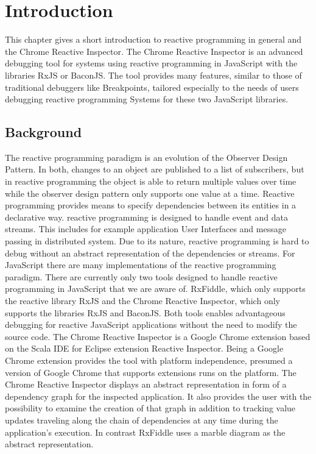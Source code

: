 \chapter{Introduction} \label{ch:Introduction}
This chapter gives a short introduction to reactive programming in general and the Chrome Reactive Inspector. The Chrome Reactive Inspector is an advanced debugging tool for systems using reactive programming in JavaScript with the libraries RxJS or BaconJS. The tool provides many features, similar to those of traditional debuggers like Breakpoints, tailored especially to the needs of users debugging reactive programming Systems for these two JavaScript libraries.

\section{Background}
The reactive programming paradigm is an evolution of the Observer Design Pattern. In both, changes to an object are published to a list of subscribers, but in reactive programming the object is able to return multiple values over time while the observer design pattern only supports one value at a time. Reactive programming provides means to specify dependencies between its entities in a declarative way. reactive programming is designed to handle event and data streams. This includes for example application User Interfaces and message passing in distributed system. Due to its nature, reactive programming is hard to debug without an abstract representation of the dependencies or streams.
For JavaScript there are many implementations of the reactive programming paradigm. There are currently only two tools designed to handle reactive programming in JavaScript that we are aware of. RxFiddle, which only supports the reactive library RxJS and the Chrome Reactive Inspector, which only supports the libraries RxJS and BaconJS. Both tools enables advantageous debugging for reactive JavaScript applications without the need to modify the source code. The Chrome Reactive Inspector is a Google Chrome extension based on the Scala IDE for Eclipse extension Reactive Inspector. Being a Google Chrome extension provides the tool with platform independence, presumed a version of Google Chrome that supports extensions runs on the platform.
The Chrome Reactive Inspector displays an abstract representation in form of a dependency graph for the inspected application. It also provides the user with the possibility to examine the creation of that graph in addition to tracking value updates traveling along the chain of dependencies at any time during the application's execution.%
In contrast RxFiddle uses a marble diagram as the abstract representation.

